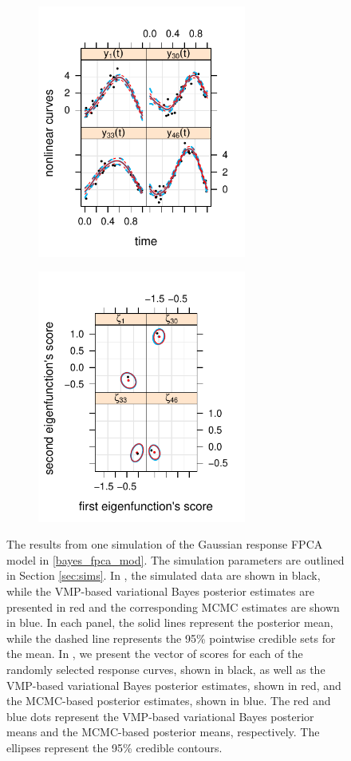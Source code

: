 \documentclass[ba]{imsart}
\numberwithin{equation}{section}
\theoremstyle{plain}
\begin{document}
\begin{figure}
	\centering
	\begin{subfigure}[t]{0.49\textwidth}
		\centering
		\includegraphics[width=2.7in]{images/response_curves.pdf}
	\caption{}
	\label{subfig:gauss_response_curves}
	\end{subfigure}
	\begin{subfigure}[t]{0.49\textwidth}
		\centering
		\includegraphics[width=2.7in]{images/scores.pdf}
	\caption{}
	\label{subfig:gauss_response_scores}
	\end{subfigure}
\caption{
	The results from one simulation of the Gaussian response FPCA model in \eqref{bayes_fpca_mod}. The
	simulation parameters are outlined in Section \ref{sec:sims}.
	In , the simulated data are shown in black, while the VMP-based
	variational Bayes posterior estimates are presented in red and the corresponding MCMC estimates
	are shown in blue. In each panel, the solid lines represent
	the posterior mean, while the dashed line represents the 95\% pointwise credible sets for the mean.
	In , we present the vector of scores for each of the
	randomly selected response curves,
	shown in black, as well as the VMP-based variational Bayes posterior estimates, shown in red, and the
	MCMC-based posterior estimates, shown in blue. The red and blue dots represent the VMP-based
	variational Bayes posterior means and the MCMC-based posterior means, respectively.
	The ellipses represent the 95\% credible contours.
}
\label{fig:gauss_resp_sim}
\end{figure}
\end{document}
